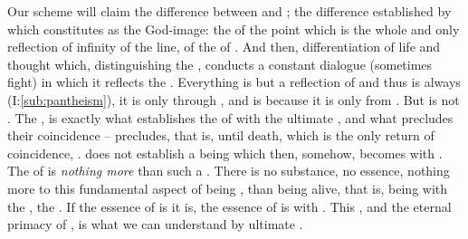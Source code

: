 Our scheme will claim the difference between  and ; the
difference established by  which constitutes  as the
God-image: the  of the point which is the whole and only
reflection of infinity of the line, of the  of . And
then, differentiation of life and thought which, distinguishing the
, conducts a constant dialogue (sometimes fight) in which it
reflects the . Everything is but a reflection of  and thus
 is always  (I:\ref{sub:pantheism}), it is  only
through , and  is  because it is  only
from . But  is not .  The , 
is exactly what establishes the  of  with the
ultimate , and what precludes their coincidence -- precludes,
that is, until death, which is the only return of coincidence,
.   does not establish a being which then, somehow,
becomes  with . The  of
 is {\em nothing more} than such a .  There is no
substance, no essence, nothing more to this fundamental aspect of being
, than being alive, that is, being  with the
,  the .  If the essence of
 is  it is, the essence of  is  with
. This , and the eternal primacy of , is what we
can understand by  ultimate .

